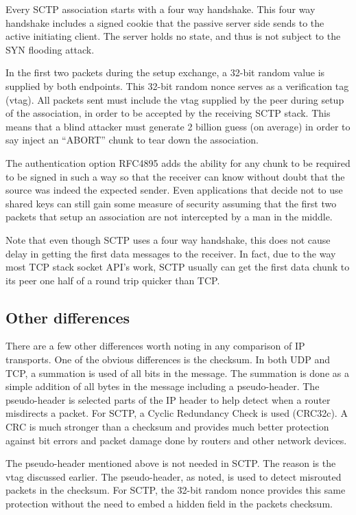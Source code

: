 \documentclass[conference]{IEEEtran}
\begin{document}
Every SCTP association starts with a four way handshake. This four
way handshake includes a signed cookie that the passive server side
sends to the active initiating client. The server holds no state, and thus
is not subject to the SYN flooding attack. 

In the first two packets during the setup exchange, a 32-bit random value is
supplied by both endpoints. This 32-bit random nonce serves as a verification
tag (vtag).  All packets sent must include the vtag supplied by the peer during
setup of the association, in order to be accepted by the receiving SCTP stack.
This means that a blind attacker must generate 2 billion guess (on average) in
order to say inject an ``ABORT'' chunk to tear down the association. 

The authentication option RFC4895\cite{rfc4895} adds the ability for any
chunk to be required to be signed in such a way so that the receiver can know
without doubt that the source was indeed the expected sender. Even applications that
decide not to use shared keys can still gain some measure of security assuming
that the first two packets that setup an association are not intercepted by a
man in the middle.

Note that even though SCTP uses a four way handshake, this does not
cause delay in getting the first data messages to the receiver. In fact,
due to the way most TCP stack socket API's work, SCTP usually can get
the first data chunk to its peer one half of a round trip quicker than TCP.

\subsection{Other differences}
\label{miscdiff}

There are a few other differences worth noting in any comparison of
IP transports. One of the obvious differences is the checksum. In both
UDP and TCP, a summation is used of all bits in the message. The summation
is done as a simple addition of all bytes in the message including a
pseudo-header. The pseudo-header is selected parts of the IP
header to help detect when a router misdirects a packet. For SCTP,
a Cyclic Redundancy Check is used (CRC32c). A CRC is much stronger
than a checksum and provides much better protection against
bit errors and packet damage done by routers and other network
devices. 

The pseudo-header mentioned above is not needed in SCTP. The reason
is the vtag discussed earlier. The pseudo-header, as noted, is used to
detect misrouted packets in the checksum. For SCTP, the 32-bit random
nonce provides this same protection without the need to embed a
hidden field in the packets checksum.
\end{document}

